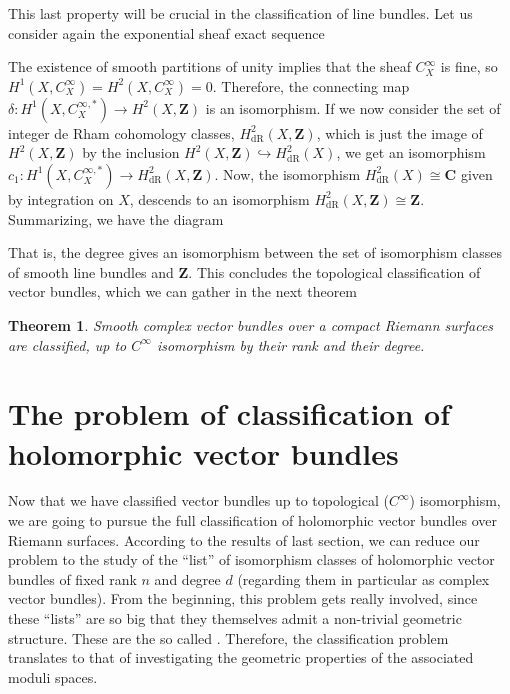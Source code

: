 \documentclass[12pt,a4paper]{book}
\newtheorem{thm}{Theorem}[section]
\theoremstyle{definition} \newtheorem{defn}[thm]{Definition}
\theoremstyle{definition} \newtheorem{ejemplo}[thm]{Example}
\theoremstyle{remark} \newtheorem{rem}[thm]{Remark}
\def\CC{\mathbf{C}}
\def\ZZ{\mathbf{Z}}
\let\emph\relax
\begin{document}
This last property will be crucial in the classification of line bundles. Let us consider again the exponential sheaf exact sequence
      \begin{center}
       \end{center}
       The existence of smooth partitions of unity implies that the sheaf $C^\infty_X$ is fine, so $H^1(X,C^\infty_X)=H^2(X,C^\infty_X)=0$. Therefore, the connecting map $\delta:H^1(X,C^{\infty,*}_X)\rightarrow H^2(X,\ZZ)$ is an isomorphism. If we now consider the set of integer de Rham cohomology classes, $H^2_{\mathrm{dR}}(X,\ZZ)$, which is just the image of $H^2(X,\ZZ)$ by the inclusion $H^2(X,\ZZ)\hookrightarrow H^2_{\mathrm{dR}}(X)$, we get an isomorphism $c_1:H^1(X,C_X^{\infty,*})\rightarrow H^2_{\mathrm{dR}}(X,\ZZ)$. Now, the isomorphism $H^2_{\mathrm{dR}}(X) \cong \CC$ given by integration on $X$, descends to an isomorphism $H^2_{\mathrm{dR}}(X,\ZZ) \cong \ZZ$.
    Summarizing, we have the diagram
       \begin{center}
       \end{center}
       That is, the degree gives an isomorphism between the set of isomorphism classes of smooth line bundles and $\ZZ$. This concludes the topological classification of vector bundles, which we can gather in the next theorem
       \begin{thm}
	 Smooth complex vector bundles over a compact Riemann surfaces are classified, up to $C^\infty$ isomorphism by their rank and their degree.
       \end{thm}
  
       \section{The problem of classification of holomorphic vector bundles}
       Now that we have classified vector bundles up to topological ($C^\infty$) isomorphism, we are going to pursue the full classification of holomorphic vector bundles over Riemann surfaces. According to the results of last section, we can reduce our problem to the study of the ``list'' of isomorphism classes of holomorphic vector bundles of fixed rank $n$ and degree $d$ (regarding them in particular as complex vector bundles). From the beginning, this problem gets really involved, since these ``lists'' are so big that they themselves admit a non-trivial geometric structure. These are the so called \emph{moduli spaces}. Therefore, the classification problem translates to that of investigating the geometric properties of the associated moduli spaces.
\end{document}
